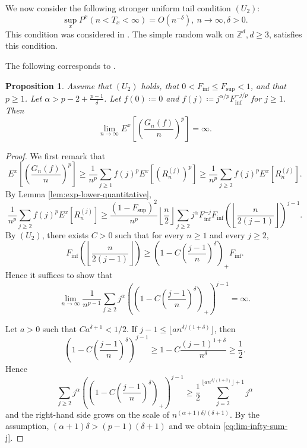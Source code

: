 \documentclass[10pt,a4paper]{amsart}
\newtheorem{Prop}[Thm]{Proposition}
\begin{document}
We now consider the following stronger uniform tail  condition $(U_2)$: 
\[ \sup_{x} P^x (n < T_x < \infty) = O(n^{-\delta}), \ n \to \infty, \delta > 0. \]
This condition was considered in \cite[Proposition 5.7]{KN2018}. 
The simple random walk on $\mathbb{Z}^d, d \ge 3$, satisfies this condition. 

The following corresponds to \cite[Remark 3]{CCMP2026}. 
\begin{Prop}\label{prop:Lp-explode}
Assume that $(U_2)$ holds, that $0 < F_{\inf} \le F_{\sup} < 1$, and that $p \ge 1$. 
Let  $\alpha > p-2 + \frac{p-1}{\delta}$. 
Let $f(0) \coloneqq 0$ and $f(j) \coloneqq j^{\alpha/p} F_{\inf}^{- j/p}$ for $j \ge 1$. 
Then 
\[ \lim_{n \to \infty} E^x \left[ \left( \frac{G_n (f)}{n} \right)^p \right] = \infty. \]
\end{Prop}


\begin{proof}
We first remark that 
\[ E^x \left[ \left( \frac{G_n (f)}{n} \right)^p \right] \ge \frac{1}{n^p} \sum_{j \ge 1} f(j)^p E^x \left[\left(R_n^{(j)}\right)^p\right] \ge \frac{1}{n^p} \sum_{j \ge 2} f(j)^p E^x \left[R_n^{(j)}\right]. \]
By Lemma \ref{lem:exp-lower-quantitative}, 
\[ \frac{1}{n^p} \sum_{j \ge 2} f(j)^p E^x \left[R_n^{(j)}\right] \ge \frac{(1-F_{\sup})^2}{n^p}   \left\lfloor \frac{n}{2} \right\rfloor \sum_{j \ge 2}  j^{\alpha} F_{\inf}^{-j} F_{\inf}\left( \left\lfloor \frac{n}{2(j-1)} \right\rfloor\right)^{j-1}. \]
By  $(U_2)$, 
there exists $C > 0$ such that for every $n \ge 1$ and every $j \ge 2$, 
\[ F_{\inf}\left( \left\lfloor \frac{n}{2(j-1)} \right\rfloor\right) \ge  \left(1 - C \left(\frac{j-1}{n}\right)^{\delta}\right)_{+}  F_{\inf}. \]
Hence it suffices to show that 
\begin{equation}\label{eq:lim-infty-sum-j}
\lim_{n \to \infty} \frac{1}{n^{p-1}} \sum_{j \ge 2} j^{\alpha} \left(\left(1 - C \left(\frac{j-1}{n}\right)^{\delta}\right)_{+}\right)^{j-1} = \infty. 
\end{equation}

Let $a > 0$ such that $C a^{\delta + 1} < 1/2$. 
If $j - 1 \le \lfloor a n^{\delta/(1+\delta)} \rfloor$, then 
\[ \left(1 - C \left(\frac{j-1}{n}\right)^{\delta}\right)^{j-1}  \ge 1 - C \frac{(j-1)^{1+\delta}}{n^{\delta}} \ge \frac{1}{2}. \]
Hence
\[ \sum_{j \ge 2} j^{\alpha} \left(\left(1 - C \left(\frac{j-1}{n}\right)^{\delta}\right)_{+}\right)^{j-1} \ge \frac{1}{2} \sum_{j=2}^{\lfloor a n^{\delta/(1+\delta)} \rfloor + 1} j^{\alpha}  \]
and the right-hand side grows on the scale of $n^{(\alpha + 1) \delta / (\delta + 1)}$. 
By the assumption, $(\alpha + 1) \delta >  (p-1) (\delta + 1)$ and we obtain \eqref{eq:lim-infty-sum-j}. 
\end{proof}
\end{document}
